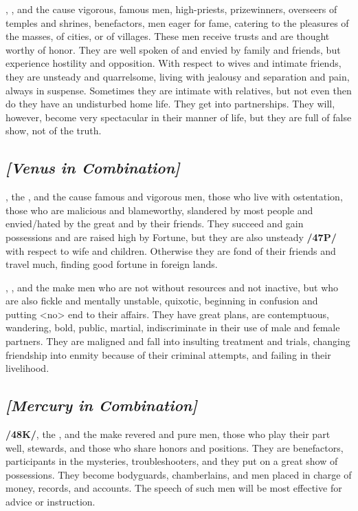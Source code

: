\Jupiter, \Venus, and the \Moon\xspace cause vigorous, famous men, high-priests, prizewinners, overseers of temples and shrines, benefactors, men eager for fame, catering to the pleasures of the masses, of cities, or of villages. These men receive trusts and are thought worthy of honor. They are well spoken of and envied by family and friends, but experience hostility and opposition. With respect to wives and intimate friends, they are unsteady and quarrelsome, living with jealousy and separation and pain, always in suspense. Sometimes they are intimate with relatives, but not even then do they have an undisturbed home life. They get into partnerships. They will, however, become very spectacular in their manner of life, but they are full of false show, not of the truth.

\secbr
\subsection{\textit{[Venus in Combination]}}
\Venus, the \Sun, and the \Moon\xspace cause famous and vigorous men, those who live with ostentation, those who are malicious and blameworthy, slandered by most people and envied/hated by the great and by their friends. They succeed and gain possessions and are raised high by Fortune, but they are also unsteady
\textbf{/47P/} with respect to wife and children. Otherwise they are fond of their friends and travel much, finding
good fortune in foreign lands.

\Venus, \Mars, and the \Moon\xspace make men who are not without resources and not inactive, but who are also fickle and mentally unstable, quixotic, beginning in confusion and putting <no> end to their affairs. They have great plans, are contemptuous, wandering, bold, public, martial, indiscriminate in their use of male and female partners. They are maligned and fall into insulting treatment and trials, changing friendship into enmity because of their criminal attempts, and failing in their livelihood.

\secbr
\subsection{\textit{[Mercury in Combination]}}
\textbf{/48K/}\Mercury, the \Sun, and the \Moon\xspace make revered and pure men, those who play their part well, stewards, and those who share honors and positions. They are benefactors, participants in the mysteries, troubleshooters, and they put on a great show of possessions. They become bodyguards, chamberlains, and men placed in charge of money, records, and accounts. The speech of such men will be most effective for advice or instruction.

